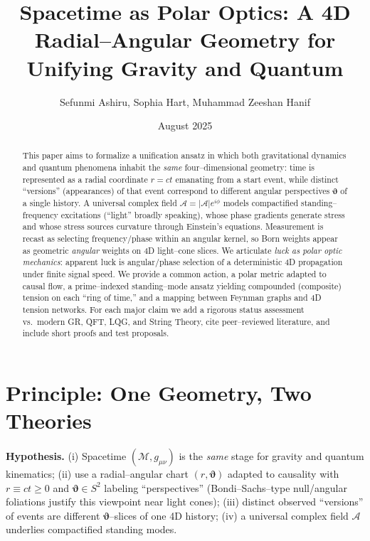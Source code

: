\documentclass[reprint,amsmath,amssymb,aps]{revtex4-2}
\newcommand{\M}{\mathcal{M}}                   %
\newcommand{\g}{g}                             %
\newcommand{\A}{\mathcal{A}}                   %
\newcommand{\angb}{\boldsymbol{\vartheta}}     %
\begin{document}
\title{Spacetime as Polar Optics: A 4D Radial--Angular Geometry for Unifying Gravity and Quantum}
\author{Sefunmi Ashiru, Sophia Hart, Muhammad Zeeshan Hanif}
\date{August 2025}

\begin{abstract}
This paper aims to formalize a unification ansatz in which both gravitational dynamics and quantum phenomena inhabit the \emph{same} four--dimensional geometry: time is represented as a radial coordinate $r=ct$ emanating from a start event, while distinct ``versions'' (appearances) of that event correspond to different angular perspectives $\angb$ of a single history. A universal complex field $\A=|\A|e^{i\phi}$ models compactified standing--frequency excitations (``light'' broadly speaking), whose phase gradients generate stress and whose stress sources curvature through Einstein's equations. Measurement is recast as selecting frequency/phase within an angular kernel, so Born weights appear as geometric \emph{angular} weights on 4D light--cone slices. We articulate \emph{luck as polar optic mechanics}: apparent luck is angular/phase selection of a deterministic 4D propagation under finite signal speed. We provide a common action, a polar metric adapted to causal flow, a prime--indexed standing--mode ansatz yielding compounded (composite) tension on each ``ring of time,'' and a mapping between Feynman graphs and 4D tension networks. For each major claim we add a rigorous status assessment vs.\ modern GR, QFT, LQG, and String Theory, cite peer--reviewed literature, and include short proofs and test proposals.
\end{abstract}

\maketitle

\section{Principle: One Geometry, Two Theories}
\textbf{Hypothesis.}
(i) Spacetime $(\M,\g_{\mu\nu})$ is the \emph{same} stage for gravity and quantum kinematics; (ii) use a radial--angular chart $(r,\angb)$ adapted to causality with $r\equiv ct\ge 0$ and $\angb\in S^2$ labeling ``perspectives'' (Bondi--Sachs--type null/angular foliations justify this viewpoint near light cones); (iii) distinct observed ``versions'' of events are different $\angb$--slices of one 4D history; (iv) a universal complex field $\A$ underlies compactified standing modes.
\end{document}
